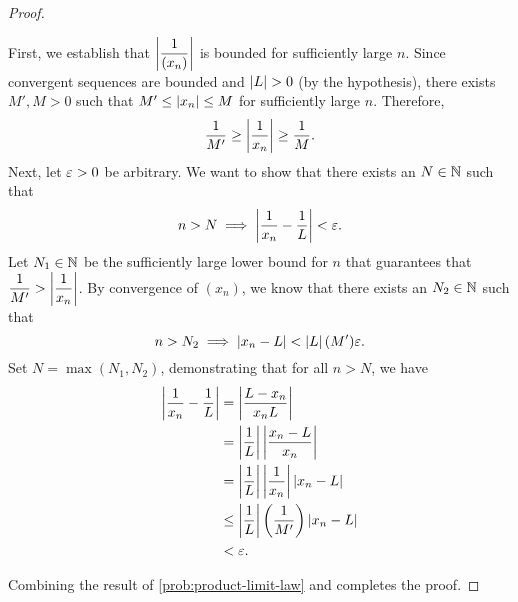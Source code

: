 \begin{problem}
\begin{enumerate}[label=(\alph*)]
\begin{proof}
          \begin{subproof}
            First, we establish that $\left\lvert \dfrac{1}{(x_{n})} \right\rvert$ is bounded for
            sufficiently large $n$. Since convergent\footnotemark{} sequences are
            bounded and $\left\lvert L \right\rvert > 0$ (by the hypothesis), there exists $M', M > 0$ 
            such that $M' \leq \left\lvert x_{n} \right\rvert \leq M$ for sufficiently large $n$. 
            Therefore, 
            \[
              \dfrac{1}{M'} \geq \left\lvert \dfrac{1}{x_{n}} \right\rvert \geq \dfrac{1}{M}.
            \]
            Next, let $\varepsilon > 0$ be arbitrary. We want to show that there exists
            an $N \in \mathbb{N}$ such that
            \begin{align*}
              n > N \implies \left\lvert \frac{1}{x_{n}} - \frac{1}{L} \right\rvert < \varepsilon.
            \end{align*}
            Let $N_{1} \in \mathbb{N}$ be the sufficiently large lower bound for $n$ that guarantees that
            $\dfrac{1}{M'} > \left\lvert \dfrac{1}{x_{n}} \right\rvert$. By convergence of
            $(x_{n})$, we know that there exists an $N_{2} \in \mathbb{N}$ such that
            \[
              n > N_{2} \implies \left\lvert x_{n} - L \right\rvert < \left\lvert L \right\rvert (M') \varepsilon.
            \]
            Set $N = \max(N_{1}, N_{2})$, demonstrating that for all $n > N$, we have
            \begin{align*}
              \left\lvert \dfrac{1}{x_{n}} - \dfrac{1}{L} \right\rvert &= \left\lvert \dfrac{L - x_{n}}{x_{n}L} \right\rvert \\
                                                    &= \left\lvert \dfrac{1}{L} \right\rvert \left\lvert \dfrac{x_{n} - L}{x_{n}} \right\rvert \\
                                                    &= \left\lvert \dfrac{1}{L} \right\rvert \left\lvert \dfrac{1}{x_{n}} \right\rvert \left\lvert x_{n} - L \right\rvert \\
                                                    &\leq \left\lvert \dfrac{1}{L} \right\rvert \left( \dfrac{1}{M'} \right) \left\lvert x_{n} - L \right\rvert \\
                                                    &< \varepsilon.
            \end{align*}
          \end{subproof}

          Combining the result of \ref{prob:product-limit-law} and
           completes the proof.
        \end{proof}

    \end{enumerate}
\end{problem}


